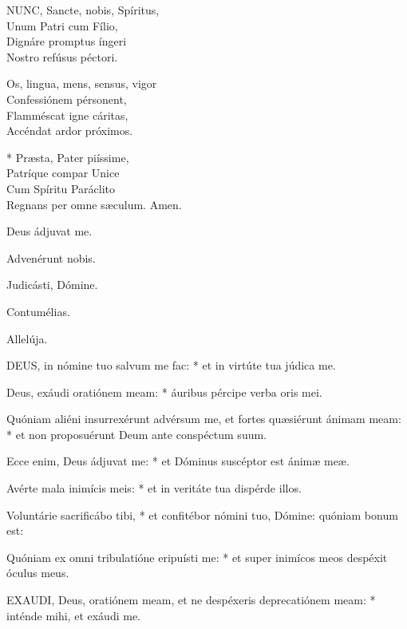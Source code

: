 \lettrine[lines=2]{N}{UNC}, Sancte, nobis, Spíritus,\\
Unum Patri cum Fílio,\\
Dignáre promptus íngeri\\
Nostro refúsus péctori.

Os, lingua, mens, sensus, vigor\\
Confessiónem pérsonent,\\
Flamméscat igne cáritas,\\
Accéndat ardor próximos.

* Præsta, Pater piíssime,\\
Patríque compar Unice\\
Cum Spíritu Paráclito\\
Regnans per omne sæculum. Amen.

  Deus ádjuvat me.



 Advenérunt nobis.


 Judicásti, Dómine.


 Contumélias.

  Allelúja.


\lettrine[lines=2]{D}{EUS}, in nómine tuo salvum me fac: * et in virtúte tua júdica me.

Deus, exáudi oratiónem meam: * áuribus pércipe verba oris mei.

Quóniam aliéni insurrexérunt advérsum me, et fortes quæsiérunt ánimam meam: * et non proposuérunt Deum ante conspéctum suum.

Ecce enim, Deus ádjuvat me: * et Dóminus suscéptor est ánimæ meæ.

Avérte mala inimícis meis: * et in veritáte tua dispérde illos.

Voluntárie sacrificábo tibi, * et confitébor nómini tuo, Dómine: quóniam bonum est:

Quóniam ex omni tribulatióne eripuísti me: * et super inimícos meos despéxit óculus meus.


\lettrine[lines=2]{E}{XAUDI}, Deus, oratiónem meam, et ne despéxeris deprecatiónem meam: * inténde mihi, et exáudi me.

